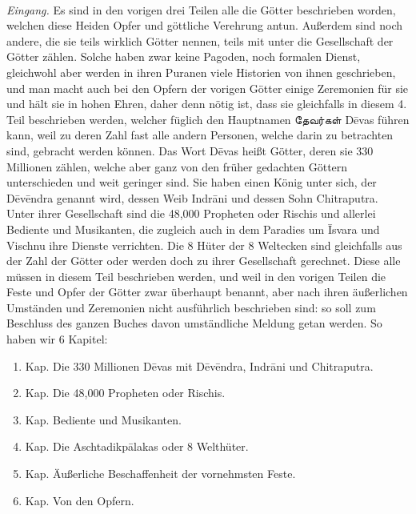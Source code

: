 \documentclass{article}
\newcommand{\TamilText}[1]{\texttamil{#1}}
\newcommand{\tam}[1]{\TamilText{#1}}
\begin{document}
\paragraph{}
\emph{Eingang.} Es sind in den vorigen drei Teilen alle die Götter beschrieben worden, welchen diese Heiden Opfer und göttliche Verehrung antun. Außerdem sind noch andere, die sie teils wirklich Götter nennen, teils mit unter die Gesellschaft der Götter zählen. Solche haben zwar keine Pagoden, noch formalen Dienst, gleichwohl aber werden in ihren Puranen viele Historien von ihnen geschrieben, und man macht auch bei den Opfern der vorigen Götter einige Zeremonien für sie und hält sie in hohen Ehren, daher denn nötig ist, dass sie gleichfalls in diesem 4. Teil beschrieben werden, welcher füglich den Hauptnamen \tam{தேவர்கள்} D\={e}vas führen kann, weil zu deren Zahl fast alle andern Personen, welche darin zu betrachten sind, gebracht werden können. Das Wort D\={e}vas heißt Götter, deren sie 330 Millionen zählen, welche aber ganz von den früher gedachten Göttern unterschieden und weit geringer sind. Sie haben einen König unter sich, der D\={e}v\={e}ndra genannt wird, dessen Weib Indr\={a}ni und dessen Sohn Chitraputra. Unter ihrer Gesellschaft sind die 48,000 Propheten oder Rischis und allerlei Bediente und Musikanten, die zugleich auch in dem Paradies um \={I}svara und Vischnu ihre Dienste verrichten. Die 8 Hüter der 8 Weltecken sind gleichfalls aus der Zahl der Götter oder werden doch zu ihrer Gesellschaft gerechnet. Diese alle müssen in diesem Teil beschrieben werden, und weil in den vorigen Teilen die Feste und Opfer der Götter zwar überhaupt benannt, aber nach ihren äußerlichen Umständen und Zeremonien nicht ausführlich beschrieben sind: so soll zum Beschluss des ganzen Buches davon umständliche Meldung getan werden. So haben wir 6 Kapitel:
\begin{enumerate}
    \item Kap. Die 330 Millionen D\={e}vas mit D\={e}v\={e}ndra, Indr\={a}ni und Chitraputra.

    \item Kap. Die 48,000 Propheten oder Rischis.

    \item Kap. Bediente und Musikanten.

    \item Kap. Die Aschtadikp\={a}lakas oder 8 Welthüter.

    \item Kap. Äußerliche Beschaffenheit der vornehmsten Feste.

    \item Kap. Von den Opfern.
\end{enumerate}
\clearpage
\end{document}
